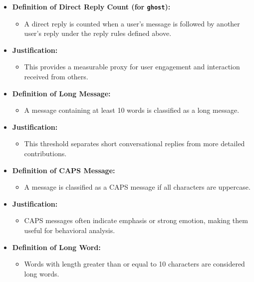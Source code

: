 \documentclass[11pt,a4paper]{article}
\begin{document}
\begin{itemize}
    \item \textbf{Definition of Direct Reply Count (for \texttt{ghost}):}
    \begin{itemize}
        \item A direct reply is counted when a user's message is followed by another user's reply under the reply rules defined above.
    \end{itemize}

    \item \textbf{Justification:}
    \begin{itemize}
        \item This provides a measurable proxy for user engagement and interaction received from others.
    \end{itemize}

    \item \textbf{Definition of Long Message:}
    \begin{itemize}
        \item A message containing at least 10 words is classified as a long message.
    \end{itemize}

    \item \textbf{Justification:}
    \begin{itemize}
        \item This threshold separates short conversational replies from more detailed contributions.
    \end{itemize}

    \item \textbf{Definition of CAPS Message:}
    \begin{itemize}
        \item A message is classified as a CAPS message if all characters are uppercase.
    \end{itemize}

    \item \textbf{Justification:}
    \begin{itemize}
        \item CAPS messages often indicate emphasis or strong emotion, making them useful for behavioral analysis.
    \end{itemize}

    \item \textbf{Definition of Long Word:}
    \begin{itemize}
        \item Words with length greater than or equal to 10 characters are considered long words.
    \end{itemize}


\end{itemize}
\end{document}
